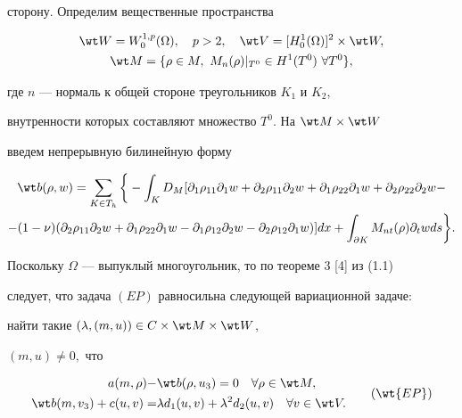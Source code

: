 сторону. Определим вещественные пространства


\begin{gather*}


\wt W=W_0^{1,p}(\Omega),\quad p>2,


\quad \wt V=[H_0^1(\Omega)]^2\times\wt W, \\


%


\wt M=\{\rho\in M,\ M_n(\rho)|_{T^0} \in H^1(T^0)\ \forall T^0\},


\end{gather*}


где $n$ --- нормаль к общей стороне треугольников $K_1$ и $K_2$, 


внутренности которых составляют множество $T^0$. На $\wt M\times\wt W$


введем непрерывную билинейную форму


\begin{multline*}


\wt b(\rho,w)=\sum_{K\in T_h}\bigg\{


-\int_K D_M [\partial_1 \rho_{11}\partial_1 w


+\partial_2 \rho_{11}\partial_2 w+\partial_1 \rho_{22}\partial_1 w


+\partial_2 \rho_{22}\partial_2 w-\\


%


-(1-\nu)(\partial_2 \rho_{11}\partial_2 w+\partial_1 \rho_{22}\partial_1 w


-\partial_1 \rho_{12}\partial_2 w-\partial_2 \rho_{12}\partial_1 w)]dx+


\int_{\partial K}M_{nt}(\rho)\partial_t wds\bigg\}.


\end{multline*}





Поскольку $\Omega$ --- выпуклый многоугольник, то по теореме 3 [4] из (1.1)


следует, что задача $(EP)$ равносильна следующей вариационной задаче:


найти такие $(\lambda,(m,u))\in C\times\wt M\times\wt W$,


$(m,u)\neq 0,$ что


\begin{equation}


\begin{split}


a(m,\rho)-&\wt b(\rho,u_3)=0\quad\forall \rho \in \wt M, \\


%


\wt b(m,v_3)+c(u,v)=&\lambda d_1(u,v)+{\lambda}^2 d_2(u,v)


\quad \forall v \in \wt V.


\end{split}


\tag{$\wt{EP}$}


\end{equation}





